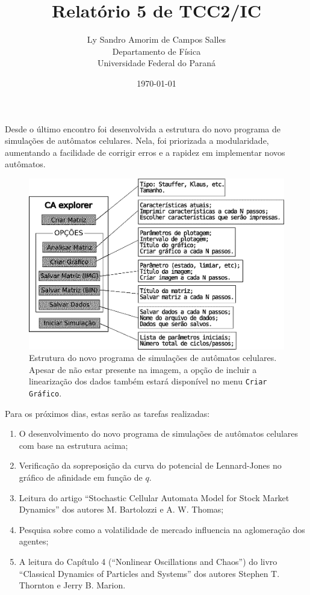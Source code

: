 \documentclass[12pt,a4paper,final]{article}
\title{Relatório 5 de TCC2/IC}
\author{Ly Sandro Amorim de Campos Salles\\Departamento de Física\\Universidade Federal do Paraná}
\date{\today}
\begin{document}
	\maketitle


  Desde o último encontro foi desenvolvida a estrutura do novo programa de simulações de autômatos celulares. Nela, foi priorizada a modularidade, aumentando a facilidade de corrigir erros e a rapidez em implementar novos autômatos.
  
  \begin{figure}[h]
    \includegraphics[width=\linewidth]{estruturaCaexplorer.png}
    \caption{Estrutura do novo programa de simulações de autômatos celulares. Apesar de não estar presente na imagem, a opção de incluir a linearização dos dados também estará disponível no menu \texttt{Criar Gráfico}.}
    \label{fig:estruturaCaexplorer}
  \end{figure}

  Para os próximos dias, estas serão as tarefas realizadas:
	\begin{enumerate}
		\item O desenvolvimento do novo programa de simulações de autômatos celulares com base na estrutura acima;
		\item Verificação da sopreposição da curva do potencial de Lennard-Jones no gráfico de afinidade em função de $q$.
		\item Leitura do artigo ``Stochastic Cellular Automata Model for Stock Market Dynamics'' dos autores M. Bartolozzi e A. W. Thomas;
		\item Pesquisa sobre como a volatilidade de mercado influencia na aglomeração dos agentes;
		\item A leitura do Capítulo 4 (``Nonlinear Oscillations and Chaos'') do livro ``Classical Dynamics of Particles and Systems'' dos autores Stephen T. Thornton e Jerry B. Marion.
	\end{enumerate}
\end{document}

